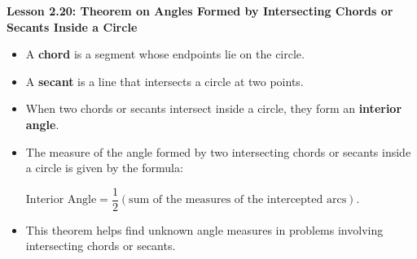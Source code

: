 \begin{center}
\textbf{Lesson 2.20: Theorem on Angles Formed by Intersecting Chords or Secants Inside a Circle}
\end{center}

\vspace*{-1.5ex}

\begin{itemize}
    \item A \textbf{chord} is a segment whose endpoints lie on the circle.
    \item A \textbf{secant} is a line that intersects a circle at two points.
    \item When two chords or secants intersect inside a circle, they form an \textbf{interior angle}.
    \item The measure of the angle formed by two intersecting chords or secants inside a circle is given by the formula:

{\centering $
    \text{Interior Angle} = \dfrac{1}{2} (\text{sum of the measures of the intercepted arcs}).
$\par}
    \item This theorem helps find unknown angle measures in problems involving intersecting chords or secants.
\end{itemize}
